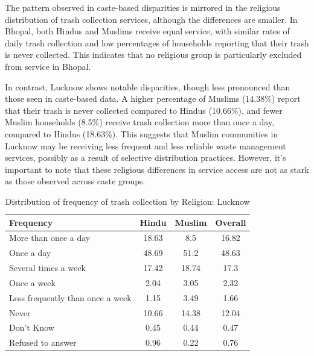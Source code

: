 The pattern observed in caste-based disparities is mirrored in the religious distribution of trash collection services, although the differences are smaller. In Bhopal, both Hindus and Muslims receive equal service, with similar rates of daily trash collection and low percentages of households reporting that their trash is never collected. This indicates that no religious group is particularly excluded from service in Bhopal.

In contrast, Lucknow shows notable disparities, though less pronounced than those seen in caste-based data. A higher percentage of Muslims (14.38\%) report that their trash is never collected compared to Hindus (10.66\%), and fewer Muslim households (8.5\%) receive trash collection more than once a day, compared to Hindus (18.63\%). This suggests that Muslim communities in Lucknow may be receiving less frequent and less reliable waste management services, possibly as a result of selective distribution practices. However, it's important to note that these religious differences in service access are not as stark as those observed across caste groups.

\begin{table}[ht]
\centering
\caption{Distribution of frequency of trash collection by Religion: Lucknow}
\label{tab:trash_religion_lucknow}
\begin{tabular}{|l|c|c|c|}
\hline
\textbf{Frequency} & \textbf{Hindu} & \textbf{Muslim} & \textbf{Overall} \\
\hline
More than once a day & 18.63 & 8.5 & 16.82 \\
\hline
Once a day & 48.69 & 51.2 & 48.63 \\
\hline
Several times a week & 17.42 & 18.74 & 17.3 \\
\hline
Once a week & 2.04 & 3.05 & 2.32 \\
\hline
Less frequently than once a week & 1.15 & 3.49 & 1.66 \\
\hline
Never & 10.66 & 14.38 & 12.04 \\
\hline
Don't Know & 0.45 & 0.44 & 0.47 \\
\hline
Refused to answer & 0.96 & 0.22 & 0.76 \\
\hline
\end{tabular}
\end{table}

